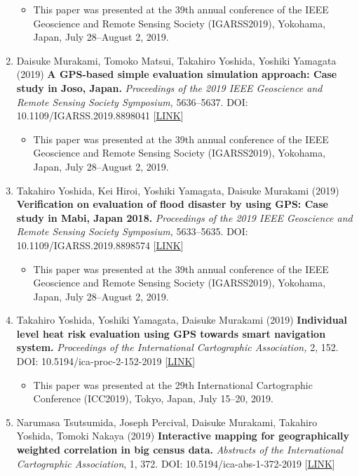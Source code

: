 \documentclass[
]{book}
\providecommand{\tightlist}{%
  \setlength{\itemsep}{0pt}\setlength{\parskip}{0pt}}
\begin{document}
\begin{enumerate}
  \begin{itemize}
  \tightlist
  \item
    This paper was presented at the 39th annual conference of the IEEE Geoscience and Remote Sensing Society (IGARSS2019), Yokohama, Japan, July 28--August 2, 2019.
  \end{itemize}
\item
  Daisuke Murakami, Tomoko Matsui, Takahiro Yoshida, Yoshiki Yamagata (2019)
  \textbf{A GPS-based simple evaluation simulation approach: Case study in Joso, Japan.}
  \emph{Proceedings of the 2019 IEEE Geoscience and Remote Sensing Society Symposium,} 5636--5637.
  DOI: 10.1109/IGARSS.2019.8898041 {[}\href{https://ieeexplore.ieee.org/document/8898041}{LINK}{]}

  \begin{itemize}
  \tightlist
  \item
    This paper was presented at the 39th annual conference of the IEEE Geoscience and Remote Sensing Society (IGARSS2019), Yokohama, Japan, July 28--August 2, 2019.
  \end{itemize}
\item
  Takahiro Yoshida, Kei Hiroi, Yoshiki Yamagata, Daisuke Murakami (2019)
  \textbf{Verification on evaluation of flood disaster by using GPS: Case study in Mabi, Japan 2018.}
  \emph{Proceedings of the 2019 IEEE Geoscience and Remote Sensing Society Symposium,} 5633--5635.
  DOI: 10.1109/IGARSS.2019.8898574 {[}\href{https://ieeexplore.ieee.org/document/8898574}{LINK}{]}

  \begin{itemize}
  \tightlist
  \item
    This paper was presented at the 39th annual conference of the IEEE Geoscience and Remote Sensing Society (IGARSS2019), Yokohama, Japan, July 28--August 2, 2019.
  \end{itemize}
\item
  Takahiro Yoshida, Yoshiki Yamagata, Daisuke Murakami (2019)
  \textbf{Individual level heat risk evaluation using GPS towards smart navigation system.}
  \emph{Proceedings of the International Cartographic Association,} 2, 152.
  DOI: 10.5194/ica-proc-2-152-2019 {[}\href{https://www.proc-int-cartogr-assoc.net/2/152/2019/}{LINK}{]}

  \begin{itemize}
  \tightlist
  \item
    This paper was presented at the 29th International Cartographic Conference (ICC2019), Tokyo, Japan, July 15--20, 2019.
  \end{itemize}
\item
  Narumasa Tsutsumida, Joseph Percival, Daisuke Murakami, Takahiro Yoshida, Tomoki Nakaya (2019)
  \textbf{Interactive mapping for geographically weighted correlation in big census data.}
  \emph{Abstracts of the International Cartographic Association}, 1, 372.
  DOI: 10.5194/ica-abs-1-372-2019 {[}\href{https://www.abstr-int-cartogr-assoc.net/1/372/2019/}{LINK}{]}


\end{enumerate}
\end{document}
